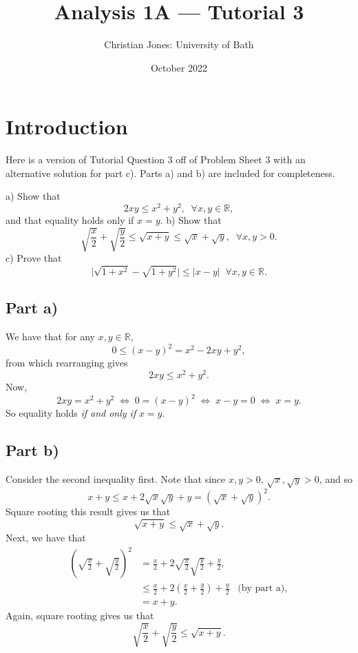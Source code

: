 \documentclass[
  10pt,
  a4paper]{article}
\title{Analysis 1A --- Tutorial 3}
\author{Christian Jones: University of Bath}
\date{October 2022}
\theoremstyle{plain}
\theoremstyle{definition}
\theoremstyle{plain}
\theoremstyle{plain}
\theoremstyle{plain}
\theoremstyle{plain}
\theoremstyle{definition}
\theoremstyle{definition}
\theoremstyle{remark}
\theoremstyle{remark}
\let\BeginKnitrBlock\begin \let\EndKnitrBlock\end
\begin{document}
\maketitle

{
\setcounter{tocdepth}{2}
\tableofcontents
}
\newpage
{}

\hypertarget{introduction}{%
\section*{Introduction}\label{introduction}}

Here is a version of Tutorial Question 3 off of Problem Sheet 3 with an alternative solution for part c). Parts a) and b) are included for completeness.

\BeginKnitrBlock{example}[PS3 Question 3]
{\label{exm:ex1} }a) Show that \[ 2xy \leq x^2 + y^2, \;\; \forall x,y \in \mathbb{R},\] and that equality holds only if \(x = y\).
b) Show that \[\sqrt{\frac{x}{2}} + \sqrt{\frac{y}{2}} \leq \sqrt{x + y} \leq \sqrt{x} + \sqrt{y}, \;\; \forall x,y > 0.\]
c) Prove that \[\lvert \sqrt{1 + x^2} - \sqrt{1 + y^2} \rvert \leq \lvert x - y \rvert \;\; \forall x,y \in \mathbb{R}.\]
\EndKnitrBlock{example}

\hypertarget{part-a}{%
\subsection*{Part a)}\label{part-a}}

\BeginKnitrBlock{solution*}
We have that for any \(x,y\in\mathbb{R},\) \[ 0 \leq (x-y)^2 = x^2 - 2xy + y^2,\] from which rearranging gives \[2xy \leq x^2 + y^2.\] Now, \[2xy = x^2 + y^2\; \Leftrightarrow\; 0 = (x-y)^2 \;\Leftrightarrow \;x-y = 0 \;\Leftrightarrow\; x=y.\] So equality holds \emph{if and only if} \(x = y.\)
\EndKnitrBlock{solution*}

\hypertarget{part-b}{%
\subsection*{Part b)}\label{part-b}}

\BeginKnitrBlock{solution*}
Consider the second inequality first. Note that since \(x,y > 0\), \(\sqrt{x}, \sqrt{y} > 0\), and so \[x + y \leq x + 2\sqrt{x}\sqrt{y} + y = (\sqrt{x} + \sqrt{y})^2.\] Square rooting this result gives us that \[\sqrt{x + y} \leq \sqrt{x} + \sqrt{y}.\] Next, we have that
\begin{align*}
\left(\sqrt{\frac{x}{2}} + \sqrt{\frac{y}{2}}\right)^2 &= \frac{x}{2} + 2\sqrt{\frac{x}{2}}\sqrt{\frac{y}{2}} + \frac{y}{2},\\
&\leq \frac{x}{2} + 2\left(\frac{x}{2} + \frac{y}{2}\right) + \frac{y}{2} \;\;\; \text{(by part a)},\\
&= x + y.
\end{align*}
Again, square rooting gives us that \[\sqrt{\frac{x}{2}} + \sqrt{\frac{y}{2}} \leq \sqrt{x + y}.\]
\EndKnitrBlock{solution*}
\end{document}
